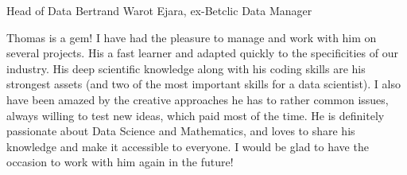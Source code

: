 \begin{cventries}

\cventry
    {Head of Data} %
    {Bertrand Warot} %
    {Ejara, ex-Betclic Data Manager} %
    {} %
    {
    \begin{cvitems}
    Thomas is a gem!
I have had the pleasure to manage and work with him on several projects.
His a fast learner and adapted quickly to the specificities of our industry. His deep scientific knowledge along with his coding skills are his strongest assets (and two of the most important skills for a data scientist). I also have been amazed by the creative approaches he has to rather common issues, always willing to test new ideas, which paid most of the time.
He is definitely passionate about Data Science and Mathematics, and loves to share his knowledge and make it accessible to everyone.
I would be glad to have the occasion to work with him again in the future!
    \end{cvitems}
    }



\end{cventries}
